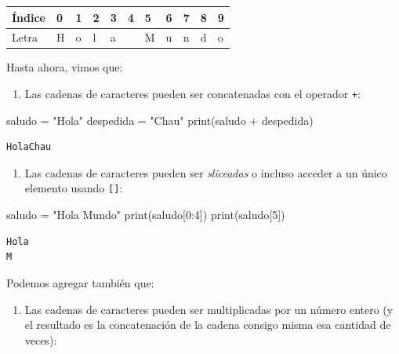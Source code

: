 \documentclass[
  letterpaper,
  DIV=11,
  numbers=noendperiod]{scrreprt}
\newenvironment{Shaded}{\begin{snugshade}}{\end{snugshade}}
\newcommand{\BuiltInTok}[1]{\textcolor[rgb]{0.00,0.23,0.31}{#1}}
\newcommand{\DecValTok}[1]{\textcolor[rgb]{0.68,0.00,0.00}{#1}}
\newcommand{\NormalTok}[1]{\textcolor[rgb]{0.00,0.23,0.31}{#1}}
\newcommand{\OperatorTok}[1]{\textcolor[rgb]{0.37,0.37,0.37}{#1}}
\newcommand{\StringTok}[1]{\textcolor[rgb]{0.13,0.47,0.30}{#1}}
\providecommand{\tightlist}{%
  \setlength{\itemsep}{0pt}\setlength{\parskip}{0pt}}\usepackage{longtable,booktabs,array}
\begin{document}
\begin{longtable}[]{@{}lllllllllll@{}}
\toprule\noalign{}
Índice & 0 & 1 & 2 & 3 & 4 & 5 & 6 & 7 & 8 & 9 \\
\midrule\noalign{}
\endhead
\bottomrule\noalign{}
\endlastfoot
Letra & H & o & l & a & & M & u & n & d & o \\
\end{longtable}

Hasta ahora, vimos que:

\begin{enumerate}
\def\labelenumi{\arabic{enumi}.}
\tightlist
\item
  Las cadenas de caracteres pueden ser concatenadas con el operador
  \texttt{+}:
\end{enumerate}

\begin{Shaded}
\begin{Highlighting}[]
\NormalTok{saludo }\OperatorTok{=} \StringTok{"Hola"}
\NormalTok{despedida }\OperatorTok{=} \StringTok{"Chau"}
\BuiltInTok{print}\NormalTok{(saludo }\OperatorTok{+}\NormalTok{ despedida)}
\end{Highlighting}
\end{Shaded}

\begin{verbatim}
HolaChau
\end{verbatim}

\begin{enumerate}
\def\labelenumi{\arabic{enumi}.}
\setcounter{enumi}{1}
\tightlist
\item
  Las cadenas de caracteres pueden ser \emph{sliceadas} o incluso
  acceder a un único elemento usando \texttt{{[}{]}}:
\end{enumerate}

\begin{Shaded}
\begin{Highlighting}[]
\NormalTok{saludo }\OperatorTok{=} \StringTok{"Hola Mundo"}
\BuiltInTok{print}\NormalTok{(saludo[}\DecValTok{0}\NormalTok{:}\DecValTok{4}\NormalTok{])}
\BuiltInTok{print}\NormalTok{(saludo[}\DecValTok{5}\NormalTok{])}
\end{Highlighting}
\end{Shaded}

\begin{verbatim}
Hola
M
\end{verbatim}

Podemos agregar también que:

\begin{enumerate}
\def\labelenumi{\arabic{enumi}.}
\setcounter{enumi}{2}
\tightlist
\item
  Las cadenas de caracteres pueden ser multiplicadas por un número
  entero (y el resultado es la concatenación de la cadena consigo misma
  esa cantidad de veces):
\end{enumerate}
\end{document}
